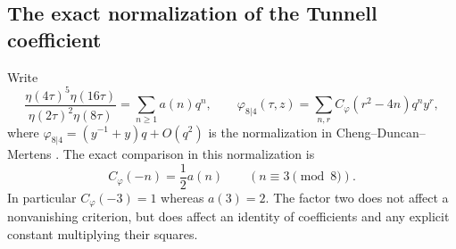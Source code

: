 \subsection{The exact normalization of the Tunnell coefficient}
\label{sec:tunnell-normalization}
Write
\[
 \frac{\eta(4\tau)^5\eta(16\tau)}{\eta(2\tau)^2\eta(8\tau)}
   =\sum_{n\geq1}a(n)q^n,
 \qquad
 \varphi_{8|4}(\tau,z)=\sum_{n,r}C_{\varphi}(r^2-4n)q^ny^r,
\]
where $\varphi_{8|4}=(y^{-1}+y)q+O(q^2)$ is the normalization in
Cheng--Duncan--Mertens \cite[equation~(4.2.9)]{CDM2025}.
The exact comparison in this normalization is
\begin{equation}\label{eq:tunnell-factor-two}
 C_{\varphi}(-n)=\frac12a(n)\qquad(n\equiv3\pmod8).
\end{equation}
In particular $C_{\varphi}(-3)=1$ whereas $a(3)=2$.
The factor two does not affect a nonvanishing criterion, but does affect
an identity of coefficients and any explicit constant multiplying their
squares.

